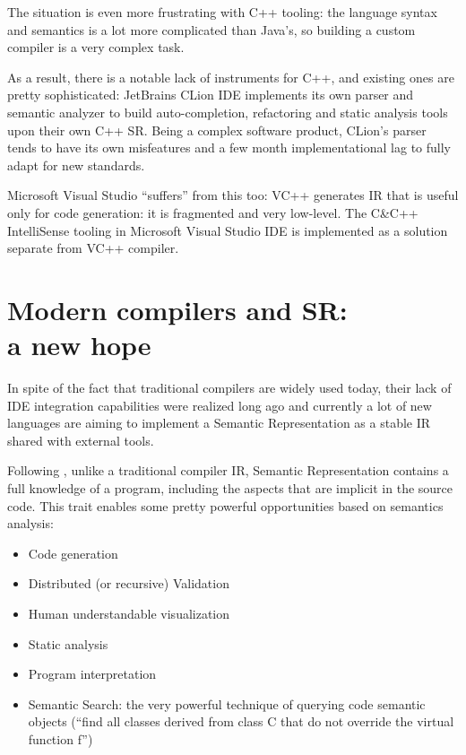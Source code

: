 The situation is even more frustrating with C++ tooling: the language syntax
and semantics is a lot more complicated than Java’s, so building a custom
compiler is a very complex task.

As a result, there is a notable lack of instruments for C++\cite{Zouev2010}, and existing
ones are pretty sophisticated: JetBrains CLion IDE implements its own parser
and semantic analyzer to build auto-completion, refactoring and static analysis
tools upon their own C++ SR. Being a complex software product, CLion’s parser
tends to have its own misfeatures and a few month implementational lag to
fully adapt for new standards.


Microsoft Visual Studio “suffers” from this too: VC++ generates IR that is useful
only for code generation: it is fragmented and very low-level.
The C\&C++ IntelliSense tooling in Microsoft Visual Studio IDE is implemented
as a solution separate from VC++ compiler.

\section{Modern compilers and SR: \\a new hope}
\label{sec:review_2}

In spite of the fact that traditional compilers are widely used today, their lack of
IDE integration capabilities were realized long ago and currently a lot of new
languages are aiming to implement a Semantic Representation as a stable IR
shared with external tools.

Following \cite{Zouev2005, Zouev2010}, unlike a traditional compiler IR, Semantic Representation contains a full
knowledge of a program, including the aspects that are implicit in the source
code. This trait enables some pretty powerful opportunities based on
semantics analysis:

\begin{itemize}
    \item Code generation
    \item Distributed (or recursive) Validation
    \item Human understandable visualization
    \item Static analysis
    \item Program interpretation
    \item Semantic Search: the very powerful technique of querying code semantic objects (“find all classes derived from class C that do not override the virtual function f”)    
\end{itemize}

